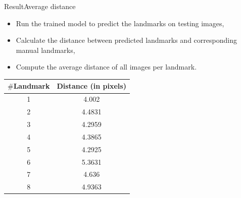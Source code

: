 \documentclass[10pt]{beamer}
\begin{document}
\begin{frame}{Result}{Average distance}
	\begin{itemize}
		\item Run the trained model to predict the landmarks on testing images,
		\item Calculate the distance between predicted landmarks and corresponding manual landmarks,
		\item Compute the average distance of all images per landmark.
	\end{itemize}
	\begin{center}
		\begin{table}[htbp]
		\centering
		\begin{tabular}{|c|c|}
		\hline
		\textbf{$\#$Landmark} & \textbf{Distance} (in pixels) \\ \hline
			1 & 4.002  \\ \hline
			2 & 4.4831 \\ \hline
			3 & 4.2959 \\ \hline
			4 & 4.3865 \\ \hline
			5 & 4.2925 \\ \hline
			6 & 5.3631 \\ \hline
			7 & 4.636 \\ \hline
			8 & 4.9363 \\ \hline
		\end{tabular}

		\end{table}
	\end{center}
\end{frame}
\end{document}
